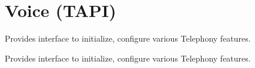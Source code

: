 \hypertarget{group__TAPI}{\section{Voice (T\-A\-P\-I)}
\label{group__TAPI}
}


Provides interface to initialize, configure various Telephony features.  


Provides interface to initialize, configure various Telephony features. 